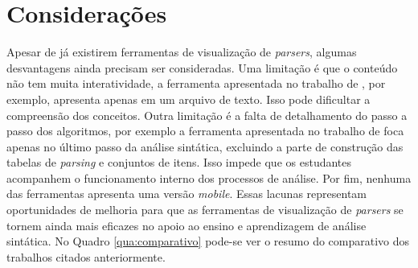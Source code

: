 \section{Considerações}
Apesar de já existirem ferramentas de visualização de \textit{parsers}, algumas desvantagens ainda precisam ser consideradas. Uma limitação é que o conteúdo não tem muita interatividade, a ferramenta apresentada no trabalho de \textcite{sangal2018pavt}, por exemplo, apresenta apenas em um arquivo de texto. Isso pode dificultar a compreensão dos conceitos. Outra limitação é a falta de detalhamento do passo a passo dos algoritmos, por exemplo a ferramenta apresentada no trabalho de \textcite{webbased} foca apenas no último passo da análise sintática, excluindo a parte de construção das tabelas de \textit{parsing} e conjuntos de itens. Isso impede que os estudantes acompanhem o funcionamento interno dos processos de análise. Por fim, nenhuma das ferramentas apresenta uma versão \textit{mobile}. Essas lacunas representam oportunidades de melhoria para que as ferramentas de visualização de \textit{parsers} se tornem ainda mais eficazes no apoio ao ensino e aprendizagem de análise sintática. No Quadro \ref{qua:comparativo} pode-se ver o resumo do comparativo dos trabalhos citados anteriormente.

\setlength{\abovecaptionskip}{10pt plus 0pt minus 0pt}
\setlength{\belowcaptionskip}{5pt plus 0pt minus 0pt}
\begin{table}[h]
\centering\setlength{\extrarowheight}{2pt}
\label{qua:comparativo}
{}
\end{table}




